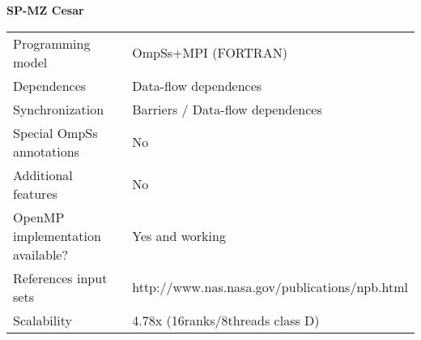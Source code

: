 
\section*{}
\label{nas_sp-mz_cesar}

\centering
\Huge
\textbf{SP-MZ Cesar}

\begin{table}[h!]
  \large
  \centering
  \begin{tabular}{|l|l|}
    \hline
    Programming model                &  OmpSs+MPI (FORTRAN)\\
    Dependences                      &  Data-flow dependences\\
    Synchronization                  &  Barriers / Data-flow dependences\\
    Special OmpSs annotations        &  No\\
    Additional features              &  No\\
    OpenMP implementation available? &  Yes and working\\
    References input sets            &  http://www.nas.nasa.gov/publications/npb.html\\
    Scalability                      &  4.78x (16ranks/8threads class D)\\
    \hline
  \end{tabular}
\end{table}

\newpage
